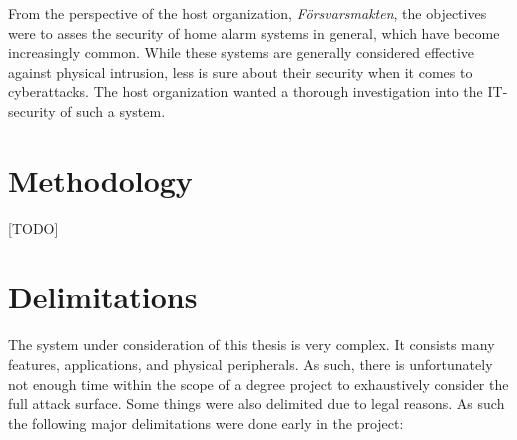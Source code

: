 From the perspective of the host organization, \textit{Försvarsmakten}, the objectives were to asses the security of home alarm systems in general, which have become increasingly common. While these systems are generally considered effective against physical intrusion, less is sure about their security when it comes to cyberattacks. The host organization wanted a thorough investigation into the IT-security of such a system.

\section{Methodology} \label{ch:intro:methodology}

[TODO]

\section{Delimitations} \label{ch:intro:delimitations}
The system under consideration of this thesis is very complex. It consists many features, applications, and physical peripherals. As such, there is unfortunately not enough time within the scope of a degree project to exhaustively consider the full attack surface. Some things were also delimited due to legal reasons. As such the following major delimitations were done early in the project:

